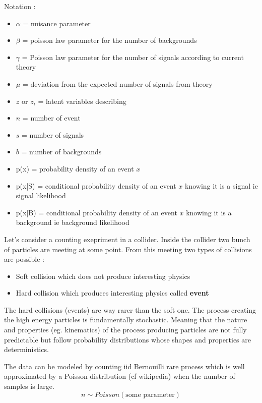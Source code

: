 Notation :
\begin{itemize}
	\item $\alpha$ = nuisance parameter
	\item $\beta$ = poisson law parameter for the number of backgrounds
	\item $\gamma$ = Poisson law parameter for the number of signals according to current theory
	\item $\mu$ = deviation from the expected number of signals from theory
	\item $z$ or $z_i$ = latent variables describing 
	\item $n$ = number of event
	\item $s$ = number of signals
	\item $b$ = number of backgrounds
	\item p(x) = probability density of an event $x$
	\item p(x|S) = conditional probability density of an event $x$ knowing it is a signal ie signal likelihood
	\item p(x|B) = conditional probability density of an event $x$ knowing it is a background ie background likelihood
\end{itemize}

Let's consider a counting exepriment in a collider.
Inside the collider two bunch of particles are meeting at some point.
From this meeting two types of collisions are possible :
\begin{itemize}
	\item Soft collision which does not produce interesting physics
	\item Hard collision which produces interesting physics called \textbf{event}
\end{itemize}

The hard collisions (events) are way rarer than the soft one.
The process creating the high energy particles is fundamentally stochastic.
Meaning that the nature and properties (eg. kinematics) of the process producing particles are not fully predictable but follow probability distributions whose shapes and properties are deterministics.

The data can be modeled by counting iid Bernouilli rare process which is well approximated by a Poisson distribution \needcite (cf wikipedia) when the number of samples is large.
\begin{equation}
	n \sim Poisson(\text{some parameter})
\end{equation}


